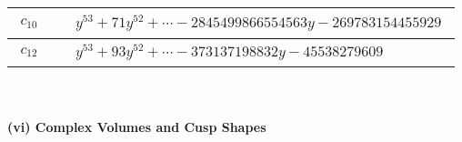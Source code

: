 \documentclass[1p]{elsarticle_modified}
\theoremstyle{definition}
\begin{document}
\begin{tabular}{m{50pt}|m{274pt}}
\hline $$\begin{aligned}c_{10}\end{aligned}$$&$\begin{aligned}
&y^{53}+71 y^{52}+\cdots-2845499866554563 y-269783154455929
\end{aligned}$\\
\hline $$\begin{aligned}c_{12}\end{aligned}$$&$\begin{aligned}
&y^{53}+93 y^{52}+\cdots-373137198832 y-45538279609
\end{aligned}$\\
\hline
\end{tabular}\\~\\
\newpage\flushleft \textbf{(vi) Complex Volumes and Cusp Shapes}
\end{document}
